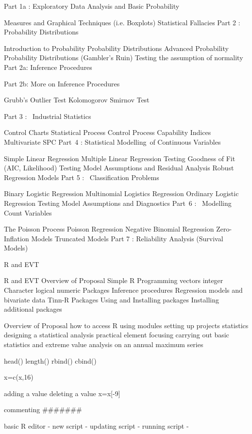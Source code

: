 \documentclass[a4paper,12pt]{article}
\begin{document}
\tableofcontents

Part 1a : Exploratory Data Analysis and Basic Probability

Measures and Graphical Techniques (i.e. Boxplots)
Statistical Fallacies
Part 2 : Probability Distributions

Introduction to Probability
Probability Distributions
Advanced Probability
Probability Distributions (Gambler's Ruin)
Testing the assumption of normality
Part 2a: Inference Procedures

Part 2b: More on Inference Procedures

Grubb's Outlier Test
Kolomogorov Smirnov Test


Part 3 :  Industrial Statistics

Control Charts
Statistical Process Control
Process Capability Indices
Multivariate SPC
Part 4 : Statistical Modelling of Continuous Variables

Simple Linear Regression
Multiple Linear Regression
Testing Goodness of Fit  (AIC, Likelihood)
Testing Model Assumptions and Residual Analysis
Robust Regression Models
Part 5 :  Classification Problems

Binary Logistic Regression
Multinomial Logistics Regression
Ordinary Logistic Regression
Testing Model Assumptions and Diagnostics
Part 6 :  Modelling Count Variables

The Poisson Process
Poisson Regression
Negative Binomial Regression
Zero-Inflation Models
Truncated Models
Part 7 : Reliability Analysis (Survival Models)






R and EVT

R and EVT
Overview of Proposal
Simple R Programming
vectors
integer
Character
logical
numeric
Packages
Inference procedures
Regression models and bivariate data
Tinn-R
Packages
Using and Installing packages
Installing additional packages

Overview of Proposal
how to access R
using modules
setting up projects
statistics
designing a statistical analysis
practical element focusing carrying out basic statistics and extreme value analysis on an annual maximum series
 
 
head()
length()
rbind()
cbind()

x=c(x,16)

adding a value
deleting a value
x=x[-9]

commenting #######


basic R editor
 - new script
 - updating script
 - running script
 -
 
\end{document}
